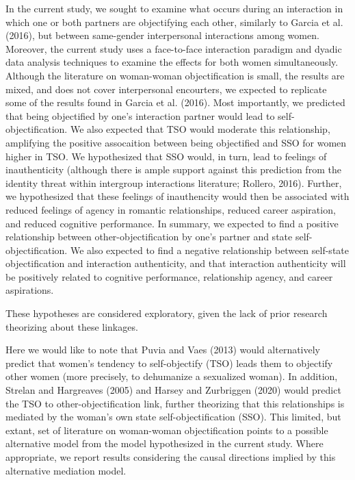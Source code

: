 \documentclass[man]{apa6}
\begin{document}
In the current study, we sought to examine what occurs during an
interaction in which one or both partners are objectifying each other,
similarly to Garcia et al. (2016), but between same-gender interpersonal
interactions among women. Moreover, the current study uses a
face-to-face interaction paradigm and dyadic data analysis techniques to
examine the effects for both women simultaneously. Although the
literature on woman-woman objectification is small, the results are
mixed, and does not cover interpersonal encourters, we expected to
replicate some of the results found in Garcia et al. (2016). Most
importantly, we predicted that being objectified by one's interaction
partner would lead to self-objectification. We also expected that TSO
would moderate this relationship, amplifying the positive assocaition
between being objectified and SSO for women higher in TSO. We
hypothesized that SSO would, in turn, lead to feelings of inauthenticity
(although there is ample support against this prediction from the
identity threat within intergroup interactions literature; Rollero,
2016). Further, we hypothesized that these feelings of inauthencity
would then be associated with reduced feelings of agency in romantic
relationships, reduced career aspiration, and reduced cognitive
performance. In summary, we expected to find a positive relationship
between other-objectification by one's partner and state
self-objectification. We also expected to find a negative relationship
between self-state objectification and interaction authenticity, and
that interaction authenticity will be positively related to cognitive
performance, relationship agency, and career aspirations.

These hypotheses are considered exploratory, given the lack of prior
research theorizing about these linkages.

Here we would like to note that Puvia and Vaes (2013) would
alternatively predict that women's tendency to self-objectify (TSO)
leads them to objectify other women (more precisely, to dehumanize a
sexualized woman). In addition, Strelan and Hargreaves (2005) and Harsey
and Zurbriggen (2020) would predict the TSO to other-objectification
link, further theorizing that this relationships is mediated by the
woman's own state self-objectification (SSO). This limited, but extant,
set of literature on woman-woman objectification points to a possible
alternative model from the model hypothesized in the current study.
Where appropriate, we report results considering the causal directions
implied by this alternative mediation model.
\end{document}
